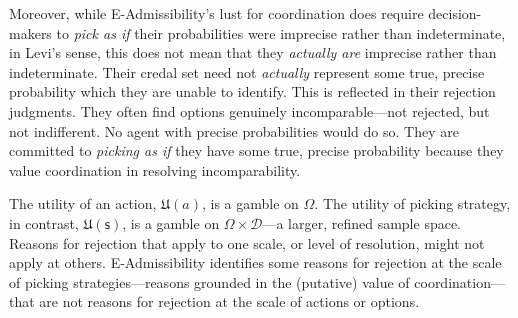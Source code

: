 \documentclass[a4paper]{article}
\newcommand\U{\mathfrak{U}} %
\newcommand{\D}{\mathcal{D}}
\newcommand\s{\mathsf{s}}
\renewcommand{\color}[1]{}
\newenvironment{CCM rewritten}
{\begingroup\color{blue}} %
{\endgroup}              %
\begin{document}
Moreover, while E-Admissibility's lust for coordination does require decision-makers to \emph{pick as if} their probabilities were imprecise rather than indeterminate, in Levi's sense, this does not mean that they \emph{actually are} imprecise rather than indeterminate. Their credal set need not \emph{actually} represent some true, precise probability which they are unable to identify. This is reflected in their rejection judgments. They often find options genuinely incomparable---not rejected, but not indifferent. No agent with precise probabilities would do so. They are committed to \emph{picking as if} they have some true, precise probability because they value coordination in resolving incomparability.

The utility of an action, $\U(a)$, is a gamble on $\Omega$. The utility of picking strategy, in contrast, $\U(\s)$, is a gamble on $\Omega\times\D$---a larger, refined sample space. Reasons for rejection that apply to one scale, or level of resolution, might not apply at others. E-Admissibility identifies some reasons for rejection at the scale of picking strategies---reasons grounded in the (putative) value of coordination---that are not reasons for rejection at the scale of actions or options. 


\end{document}
